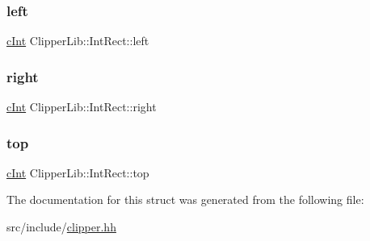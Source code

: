 \mbox{\label{struct_clipper_lib_1_1_int_rect_a9bf519994ffc7d1d5752fb1e2411b4cd}} 
\subsubsection{\texorpdfstring{left}{left}}
{\footnotesize\ttfamily \mbox{\hyperlink{namespace_clipper_lib_a7156730a24951629192d4831334bafaa}{c\+Int}} Clipper\+Lib\+::\+Int\+Rect\+::left}

\mbox{\label{struct_clipper_lib_1_1_int_rect_a28c68b5f806a88a187a53f3956954e74}} 
\subsubsection{\texorpdfstring{right}{right}}
{\footnotesize\ttfamily \mbox{\hyperlink{namespace_clipper_lib_a7156730a24951629192d4831334bafaa}{c\+Int}} Clipper\+Lib\+::\+Int\+Rect\+::right}

\mbox{\label{struct_clipper_lib_1_1_int_rect_a07154695bf2313182400f829ba07c3a9}} 
\subsubsection{\texorpdfstring{top}{top}}
{\footnotesize\ttfamily \mbox{\hyperlink{namespace_clipper_lib_a7156730a24951629192d4831334bafaa}{c\+Int}} Clipper\+Lib\+::\+Int\+Rect\+::top}



The documentation for this struct was generated from the following file\+:\begin{DoxyCompactItemize}
\item 
src/include/\mbox{\hyperlink{clipper_8hh}{clipper.\+hh}}\end{DoxyCompactItemize}
